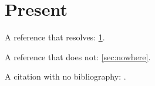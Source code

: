 \documentclass[11pt]{article}
\begin{document}
\section{Present}
\label{sec:present}

A reference that resolves: \ref{sec:present}.

A reference that does not: \ref{sec:nowhere}.

A citation with no bibliography: \cite{nosuchkey}.
\end{document}

